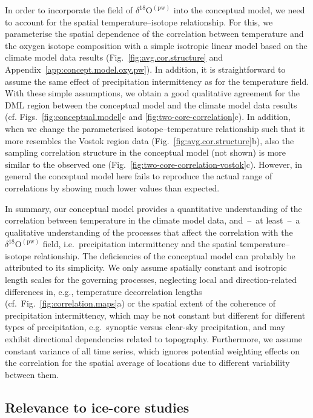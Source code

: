 \documentclass[cp, manuscript, draft]{copernicus}
\begin{document}
In order to incorporate the field of $\delta^{18}\mathrm{O}^{\mathrm{(pw)}}$
into the conceptual model, we need to account for the spatial
temperature--isotope relationship. For this, we parameterise the spatial
dependence of the correlation between temperature and the oxygen isotope
composition with a simple isotropic linear model based on the climate model data
results (Fig.~\ref{fig:avg.cor.structure} and
Appendix~\ref{app:concept.model.oxy.pw}). In addition, it is straightforward to
assume the same effect of precipitation intermittency as for the temperature
field. With these simple assumptions, we obtain a good qualitative agreement for
the DML region between the conceptual model and the climate model data results
(cf. Figs.~\ref{fig:conceptual.model}c and \ref{fig:two-core-correlation}c). In
addition, when we change the parameterised isotope--temperature relationship
such that it more resembles the Vostok region data
(Fig.~\ref{fig:avg.cor.structure}b), also the sampling correlation structure in
the conceptual model (not shown) is more similar to the observed one
(Fig.~\ref{fig:two-core-correlation-vostok}c). However, in general the
conceptual model here fails to reproduce the actual range of correlations by
showing much lower values than expected.

In summary, our conceptual model provides a quantitative understanding of the
correlation between temperature in the climate model data, and~--~at least~--~a
qualitative understanding of the processes that affect the correlation with the
$\delta^{18}\mathrm{O}^{\mathrm{(pw)}}$ field, i.e.\ precipitation intermittency
and the spatial temperature--isotope relationship. The deficiencies of the
conceptual model can probably be attributed to its simplicity. We only assume
spatially constant and isotropic length scales for the governing processes,
neglecting local and direction-related differences in, e.g., temperature
decorrelation lengths (cf.~Fig.~\ref{fig:correlation.maps}a) or the spatial
extent of the coherence of precipitation intermittency, which may be not
constant but different for different types of precipitation, e.g.\ synoptic
versus clear-sky precipitation, and may exhibit directional dependencies
related to topography. Furthermore, we assume constant variance of all
time series, which ignores potential weighting effects on the correlation for
the spatial average of locations due to different variability between them.

\subsection{Relevance to ice-core studies}
\label{discussion:relevance}
\end{document}
